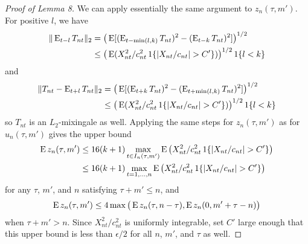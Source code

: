 \documentclass[11pt]{article}
\begin{document}
{\begin{proof}[Proof of Lemma 8]
  We can apply essentially the same argument to $z_n(\tau, m')$. For
  positive $l$, we have
  \begin{align*}
    \| \operatorname{E}_{t-l} T_{nt} \|_2 &=
    \big(\operatorname{E}[(\operatorname{E}_{t-\min(l, k)} T_{nt})^2 - (\operatorname{E}_{t-k} T_{nt})^2]\big)^{1/2} \\
    &\leq \big(\operatorname{E}( X_{nt}^2/c_{nt}^2
    \operatorname{1}\{|X_{nt}/c_{nt}| > C'\}) \big)^{1/2}\operatorname{1}\{l < k\}
  \end{align*}
  and
  \begin{align*}
    \| T_{nt} - \operatorname{E}_{t+l} T_{nt} \|_2
    &= \big(\operatorname{E}[ (\operatorname{E}_{t+k} T_{nt} )^2 - (\operatorname{E}_{t+\min(l,k)} T_{nt})^2] \big)^{1/2}\\
    &\leq \big(\operatorname{E}( X_{nt}^2/c_{nt}^2
    \operatorname{1}\{|X_{nt}/c_{nt}| > C'\})\big)^{1/2} \operatorname{1}\{l < k\}
  \end{align*}
  so $T_{nt}$ is an $L_2$-mixingale as well. Applying the same steps
  for $z_{n}(\tau, m')$ as for $u_n(\tau, m')$ gives the upper bound
  \begin{align*}
    \operatorname{E} z_n(\tau, m')
    &\leq 16 (k+1) \max_{t \in I_n(\tau, m')} \operatorname{E}\big( X_{nt}^2/c_{nt}^2
    \operatorname{1}\{|X_{nt}/c_{nt}| > C'\}\big) \\
    &\leq 16 (k+1) \max_{t = 1,\dots,n} \operatorname{E}\big( X_{nt}^2/c_{nt}^2
    \operatorname{1}\{|X_{nt}/c_{nt}| > C'\}\big)
  \end{align*}
  for any $\tau$, $m'$, and $n$ satisfying $\tau + m' \leq n$, and
  \begin{equation*}
    \operatorname{E} z_n(\tau, m')
    \leq 4 \max\big(\operatorname{E} z_n(\tau, n - \tau),
                    \operatorname{E} z_n(0, m' + \tau - n) \big)
  \end{equation*}
  when $\tau + m' > n$.
  Since $X_{nt}^2/c_{nt}^2$ is uniformly integrable, set $C'$ large
  enough that this upper bound is less than $\epsilon/2$ for all $n$,
  $m'$, and $\tau$ as well.


\end{proof}}
\end{document}
